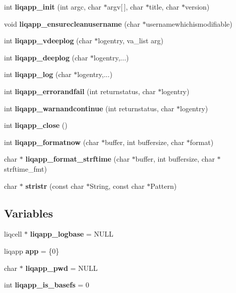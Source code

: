 \begin{CompactItemize}
\item 
int {\bf liqapp\_\-init} (int argc, char $\ast$argv[$\,$], char $\ast$title, char $\ast$version)
\item 
void \textbf{liqapp\_\-ensurecleanusername} (char $\ast$usernamewhichismodifiable)\label{d7/dbc/liqapp_8c_8cc07c2a1e2fcba18ae7defb1ef66bc0}

\item 
int {\bf liqapp\_\-vdeeplog} (char $\ast$logentry, va\_\-list arg)
\item 
int {\bf liqapp\_\-deeplog} (char $\ast$logentry,...)
\item 
int {\bf liqapp\_\-log} (char $\ast$logentry,...)
\item 
int {\bf liqapp\_\-errorandfail} (int returnstatus, char $\ast$logentry)
\item 
int {\bf liqapp\_\-warnandcontinue} (int returnstatus, char $\ast$logentry)
\item 
int \textbf{liqapp\_\-close} ()\label{d7/dbc/liqapp_8c_641cbf41bbbf42b36bc88d0fa52b0027}

\item 
int \textbf{liqapp\_\-formatnow} (char $\ast$buffer, int buffersize, char $\ast$format)\label{d7/dbc/liqapp_8c_fd755486f2d75e41941357fb29ea3084}

\item 
char $\ast$ \textbf{liqapp\_\-format\_\-strftime} (char $\ast$buffer, int buffersize, char $\ast$strftime\_\-fmt)\label{d7/dbc/liqapp_8c_84276bd9bbfbb0c60c34d04292ecfc41}

\item 
char $\ast$ \textbf{stristr} (const char $\ast$String, const char $\ast$Pattern)\label{d7/dbc/liqapp_8c_fad221b0daa654d64b4adb85ec63fedb}

\end{CompactItemize}
\subsection*{Variables}
\begin{CompactItemize}
\item 
liqcell $\ast$ \textbf{liqapp\_\-logbase} = NULL\label{d7/dbc/liqapp_8c_ab88b98d0bb85f89a04826d4fd146980}

\item 
liqapp \textbf{app} = \{0\}\label{d7/dbc/liqapp_8c_8c5b43b0bddc2898a90f7e2d2e913e92}

\item 
char $\ast$ \textbf{liqapp\_\-pwd} = NULL\label{d7/dbc/liqapp_8c_d42d06766ccd42c6459b47e39aa57c85}

\item 
int \textbf{liqapp\_\-is\_\-basefs} = 0\label{d7/dbc/liqapp_8c_52bb00c1fc02af7da25ffad52f221609}

\end{CompactItemize}


